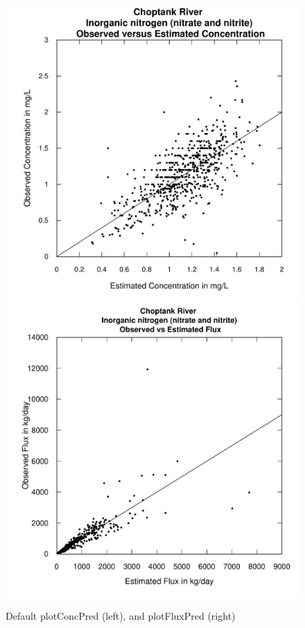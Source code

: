 \documentclass[a4paper,11pt]{article}\usepackage{graphicx, color}
\newenvironment{knitrout}{}{} %
\begin{document}
\begin{knitrout}
\color{fgcolor}\begin{figure}[]

\includegraphics[width=.5\linewidth,height=.5\linewidth]{figure/plotFluxPred1} 
\includegraphics[width=.5\linewidth,height=.5\linewidth]{figure/plotFluxPred2} \caption[Default plotConcPred (left), and plotFluxPred (right)]{Default plotConcPred (left), and plotFluxPred (right)\label{fig:plotFluxPred}}
\end{figure}


\end{knitrout}
\end{document}
